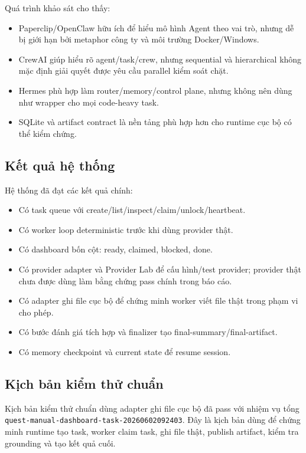 \documentclass[12pt,a4paper]{article}
\begin{document}
Quá trình khảo sát cho thấy:

\begin{itemize}
    \item Paperclip/OpenClaw hữu ích để hiểu mô hình Agent theo vai trò, nhưng dễ bị giới hạn bởi metaphor công ty và môi trường Docker/Windows.
    \item CrewAI giúp hiểu rõ agent/task/crew, nhưng sequential và hierarchical không mặc định giải quyết được yêu cầu parallel kiểm soát chặt.
    \item Hermes phù hợp làm router/memory/control plane, nhưng không nên dùng như wrapper cho mọi code-heavy task.
    \item SQLite và artifact contract là nền tảng phù hợp hơn cho runtime cục bộ có thể kiểm chứng.
\end{itemize}

\subsection{Kết quả hệ thống}

Hệ thống đã đạt các kết quả chính:

\begin{itemize}
    \item Có task queue với create/list/inspect/claim/unlock/heartbeat.
    \item Có worker loop deterministic trước khi dùng provider thật.
    \item Có dashboard bốn cột: ready, claimed, blocked, done.
    \item Có provider adapter và Provider Lab để cấu hình/test provider; provider thật chưa được dùng làm bằng chứng pass chính trong báo cáo.
    \item Có adapter ghi file cục bộ để chứng minh worker viết file thật trong phạm vi cho phép.
    \item Có bước đánh giá tích hợp và finalizer tạo final-summary/final-artifact.
    \item Có memory checkpoint và current state để resume session.
\end{itemize}

\subsection{Kịch bản kiểm thử chuẩn}

Kịch bản kiểm thử chuẩn dùng adapter ghi file cục bộ đã pass với nhiệm vụ tổng \texttt{quest-manual-dashboard-task-20260602092403}. Đây là kịch bản dùng để chứng minh runtime tạo task, worker claim task, ghi file thật, publish artifact, kiểm tra grounding và tạo kết quả cuối.
\end{document}
